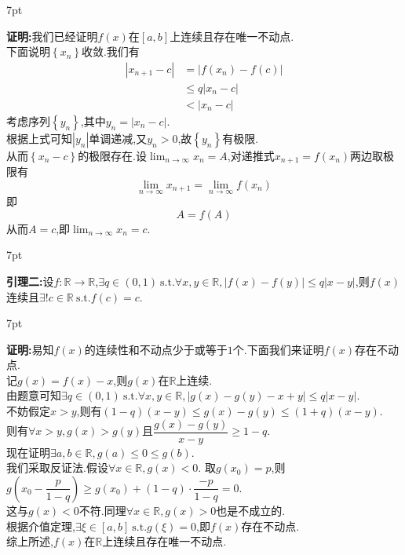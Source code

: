 \documentclass{ctexart}
\newcommand{\st}{\ \text{s.t.}}
\newenvironment{formal}{%
\def\FrameCommand{%
\hspace{1pt}%
{\color{DarkBlue}\vrule width 2pt}%
{\color{formalshade}\vrule width 4pt}%
\colorbox{formalshade}%
}%
\MakeFramed{\advance\hsize-\width\FrameRestore}%
\noindent\hspace{-4.55pt}%
\begin{adjustwidth}{}{7pt}%
\vspace{2pt}\vspace{2pt}%
}
{%
\vspace{2pt}\end{adjustwidth}\endMakeFramed%
}
\newenvironment{solution}{%
\def\FrameCommand{%
\hspace{1pt}%
{\color{solutionline}\vrule width 2pt}%
{\color{solutionshade}\vrule width 4pt}%
\colorbox{solutionshade}%
}%
\MakeFramed{\advance\hsize-\width\FrameRestore}%
\noindent\hspace{-4.55pt}%
\begin{adjustwidth}{}{7pt}%
\vspace{2pt}\vspace{2pt}%
}
{%
\vspace{2pt}\end{adjustwidth}\endMakeFramed%
}
\begin{document}
\begin{solution}
    \textbf{证明:}我们已经证明$f(x)$在$[a,b]$上连续且存在唯一不动点.\\
    下面说明$\left\{ x_n\right\}$收敛.我们有
    $$\begin{aligned}
        \left|x_{n+1}-c\right| 
        &= \left|f(x_n)-f(c)\right| \\
        &\leqslant q\left|x_n-c\right| \\
        &< \left|x_n-c\right|
    \end{aligned}$$
    考虑序列$\left\{ y_n\right\}$,其中$y_n=\left|x_n-c\right|$.\\
    根据上式可知$\left| y_n\right|$单调递减,又$y_n>0$,故$\left\{ y_n\right\}$有极限.\\
    从而$\left\{x_n-c\right\}$的极限存在.设$\displaystyle\lim_{n\to\infty}{x_n}=A$,对递推式$x_{n+1}=f(x_n)$两边取极限有
    $$\lim_{n\to\infty}{x_{n+1}}=\lim_{n\to\infty}{f(x_n)}$$
    即$$A=f(A)$$
    从而$A=c$,即$\displaystyle\lim_{n\to\infty}{x_n}=c.$
\end{solution}
\begin{formal}
    \textbf{引理二:}设$f:\mathbb{R}\to\mathbb{R}$,$\exists q\in(0,1)\st\forall x,y\in\mathbb{R},\left\lvert f(x)-f(y)\right\rvert\leqslant q\left\lvert x-y\right\rvert$,则$f(x)$连续且$\exists!c\in\mathbb{R}\st f(c)=c$.
\end{formal}
\begin{solution}
    \textbf{证明:}易知$f(x)$的连续性和不动点少于或等于$1$个.下面我们来证明$f(x)$存在不动点.\\
    记$g(x)=f(x)-x$,则$g(x)$在$\mathbb{R}$上连续.\\
    由题意可知$\exists q\in(0,1)\st\forall x,y\in\mathbb{R},\left\lvert g(x)-g(y)-x+y\right\rvert\leqslant q\left\lvert x-y\right\rvert$.\\
    不妨假定$x>y$,则有$(1-q)(x-y)\leqslant g(x)-g(y)\leqslant(1+q)(x-y).$\\
    则有$\forall x>y,g(x)>g(y)$且$\dfrac{g(x)-g(y)}{x-y}\geqslant 1-q$.\\
    现在证明$\exists a,b\in\mathbb{R},g(a)\leqslant 0\leqslant g(b)$.\\
    我们采取反证法.假设$\forall x\in\mathbb{R},g(x)<0$.
    取$g(x_0)=p$,则$g(x_0-\dfrac{p}{1-q})\geqslant g(x_0)+(1-q)\cdot\dfrac{-p}{1-q}=0$.\\
    这与$g(x)<0$不符.同理$\forall x\in\mathbb{R},g(x)>0$也是不成立的.\\
    根据介值定理,$\exists\xi\in[a,b]\st g(\xi)=0$,即$f(x)$存在不动点.\\
    综上所述,$f(x)$在$\mathbb{R}$上连续且存在唯一不动点.
\end{solution}
\end{document}
